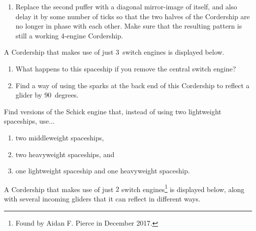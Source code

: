 \begin{multicols}{2}
\begin{problem}
\begin{enumerate}[label=\bf\color{ocre}(\alph*)]
			\item Replace the second puffer with a diagonal mirror-image of itself, and also delay it by some number of ticks so that the two halves of the Cordership are no longer in phase with each other. Make sure that the resulting pattern is still a working 4-engine Cordership.
		\end{enumerate}
	\end{problem}
	
	
	\mfilbreak
	
	
	\begin{problemstar}\label{exer:3_engine_cordership} 
		A Cordership that makes use of just $3$~switch engines is displayed below.
		
		\begin{center}
		\end{center}
		
		\begin{enumerate}[label=\bf\color{ocre}(\alph*)]
			\item What happens to this spaceship if you remove the central switch engine?
			
			\item Find a way of using the sparks at the back end of this Cordership to reflect a glider by $90$~degrees. %
		\end{enumerate}
	\end{problemstar}


	\mfilbreak
	
	
	\begin{problem}\label{exer:schick_mwss_hwss} 
		Find versions of the Schick engine that, instead of using two lightweight spaceships, use...\smallskip
		\begin{enumerate}[label=\bf\color{ocre}(\alph*)]
			\item two middleweight spaceships,
			
			\item two heavyweight spaceships, and
			
			\item one lightweight spaceship and one heavyweight spaceship.
		\end{enumerate}
	\end{problem}
	
	
	\mfilbreak
	
	
	\begin{problemstar}\label{exer:2_engine_cordership} 
		A Cordership that makes use of just $2$ switch engines\footnote{Found by Aidan F. Pierce in December 2017.} is displayed below, along with several incoming gliders that it can reflect in different ways.
		

\end{problemstar}
\end{multicols}
